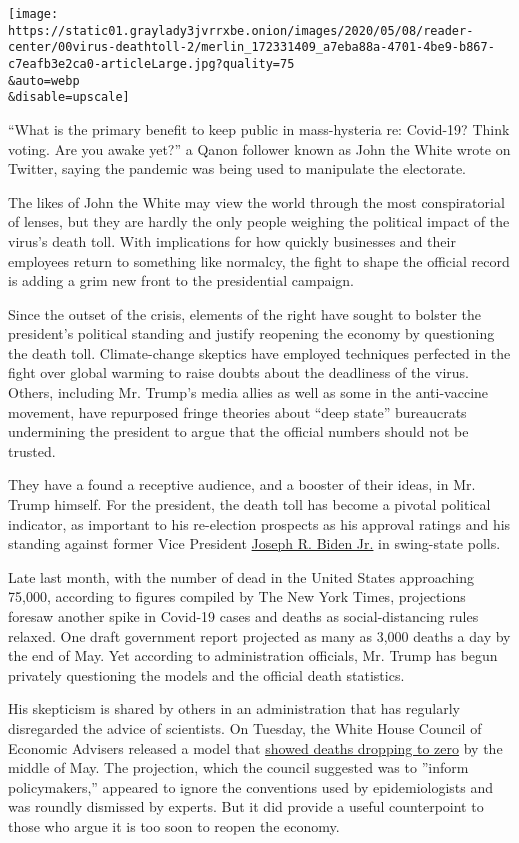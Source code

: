 \texttt{[image: https://static01.graylady3jvrrxbe.onion/images/2020/05/08/reader-center/00virus-deathtoll-2/merlin\_172331409\_a7eba88a-4701-4be9-b867-c7eafb3e2ca0-articleLarge.jpg?quality=75\\\&auto=webp\\\&disable=upscale]}

``What is the primary benefit to keep public in mass-hysteria re:
Covid-19? Think voting. Are you awake yet?'' a Qanon follower known as
John the White wrote on Twitter, saying the pandemic was being used to
manipulate the electorate.

The likes of John the White may view the world through the most
conspiratorial of lenses, but they are hardly the only people weighing
the political impact of the virus's death toll. With implications for
how quickly businesses and their employees return to something like
normalcy, the fight to shape the official record is adding a grim new
front to the presidential campaign.

Since the outset of the crisis, elements of the right have sought to
bolster the president's political standing and justify reopening the
economy by questioning the death toll. Climate-change skeptics have
employed techniques perfected in the fight over global warming to raise
doubts about the deadliness of the virus. Others, including Mr. Trump's
media allies as well as some in the anti-vaccine movement, have
repurposed fringe theories about ``deep state'' bureaucrats undermining
the president to argue that the official numbers should not be trusted.

They have a found a receptive audience, and a booster of their ideas, in
Mr. Trump himself. For the president, the death toll has become a
pivotal political indicator, as important to his re-election prospects
as his approval ratings and his standing against former Vice President
\href{https://www.nytimes3xbfgragh.onion/interactive/2020/us/elections/joe-biden.html}{Joseph
R. Biden Jr.} in swing-state polls.

Late last month, with the number of dead in the United States
approaching 75,000, according to figures compiled by The New York Times,
projections foresaw another spike in Covid-19 cases and deaths as
social-distancing rules relaxed. One draft government report projected
as many as 3,000 deaths a day by the end of May. Yet according to
administration officials, Mr. Trump has begun privately questioning the
models and the official death statistics.

His skepticism is shared by others in an administration that has
regularly disregarded the advice of scientists. On Tuesday, the White
House Council of Economic Advisers released a model that
\href{https://twitter.com/WhiteHouseCEA/status/1257680258364555264?s=20}{showed
deaths dropping to zero} by the middle of May. The projection, which the
council suggested was to ''inform policymakers,'' appeared to ignore the
conventions used by epidemiologists and was roundly dismissed by
experts. But it did provide a useful counterpoint to those who argue it
is too soon to reopen the economy.

